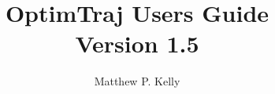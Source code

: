 \documentclass[onecolumn]{article}
\title{OptimTraj Users Guide  \\  Version 1.5}
\author{Matthew P. Kelly}
\begin{document}
\maketitle







\pagebreak
 

\end{document}
